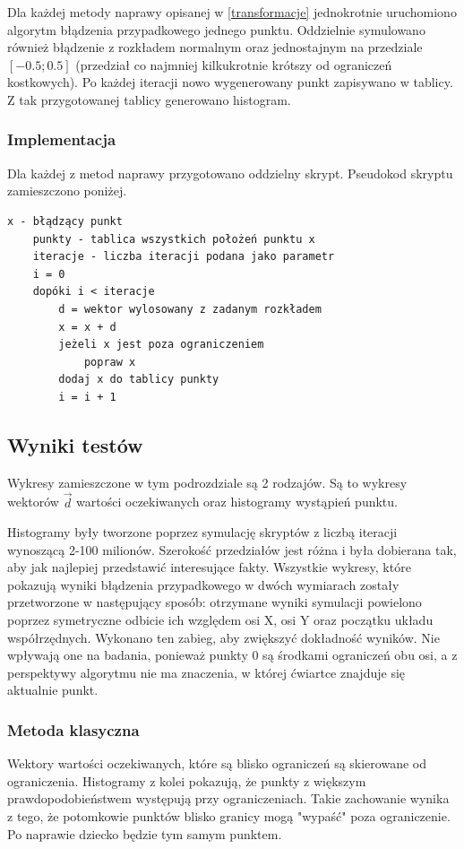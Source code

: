 \documentclass{mini}
\begin{document}
Dla każdej metody naprawy opisanej w \ref{transformacje} jednokrotnie uruchomiono algorytm błądzenia przypadkowego jednego punktu. Oddzielnie symulowano również błądzenie z rozkładem normalnym oraz jednostajnym na przedziale $[-0.5; 0.5]$ (przedział co najmniej kilkukrotnie krótszy od ograniczeń kostkowych). Po każdej iteracji nowo wygenerowany punkt zapisywano w tablicy. Z tak przygotowanej tablicy generowano histogram.

\subsubsection*{Implementacja}
Dla każdej z metod naprawy przygotowano oddzielny skrypt. Pseudokod skryptu zamieszczono poniżej.
\begin{Verbatim}[baselinestretch=1.1]
	x - błądzący punkt
	punkty - tablica wszystkich położeń punktu x
	iteracje - liczba iteracji podana jako parametr
	i = 0
	dopóki i < iteracje
		d = wektor wylosowany z zadanym rozkładem
		x = x + d
		jeżeli x jest poza ograniczeniem
			popraw x
		dodaj x do tablicy punkty
		i = i + 1
\end{Verbatim}

\subsection{Wyniki testów}
Wykresy zamieszczone w tym podrozdziale są 2 rodzajów. Są to wykresy wektorów $\overrightarrow{d}$ wartości oczekiwanych oraz histogramy wystąpień punktu.

Histogramy były tworzone poprzez symulację skryptów z liczbą iteracji wynoszącą \mbox{2-100} milionów. Szerokość przedziałów jest różna i była dobierana tak, aby jak najlepiej przedstawić interesujące fakty. Wszystkie wykresy, które pokazują wyniki błądzenia przypadkowego w dwóch wymiarach zostały przetworzone w następujący sposób: otrzymane wyniki symulacji powielono poprzez symetryczne odbicie ich względem osi X, osi Y oraz początku układu współrzędnych. Wykonano ten zabieg, aby zwiększyć dokładność wyników. Nie wpływają one na badania, ponieważ punkty 0 są środkami ograniczeń obu osi, a z perspektywy algorytmu nie ma znaczenia, w której ćwiartce znajduje się aktualnie punkt.

\subsubsection*{Metoda klasyczna}
Wektory wartości oczekiwanych, które są blisko ograniczeń są skierowane od ograniczenia. Histogramy z kolei pokazują, że punkty z większym prawdopodobieństwem występują przy ograniczeniach. Takie zachowanie wynika z tego, że potomkowie punktów blisko granicy mogą "wypaść" poza ograniczenie. Po naprawie dziecko będzie tym samym punktem.
\end{document}
